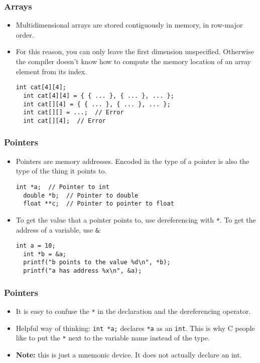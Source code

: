 \begin{frame}[fragile]
  \frametitle{Arrays}
  \begin{itemize}
  \item Multidimensional arrays are stored contiguously in memory, in row-major
    order.
  \item For this reason, you can only leave the first dimension unspecified.
    Otherwise the compiler doesn't know how to compute the memory location of an
    array element from its index.
\begin{lstlisting}[style=c]
  int cat[4][4];
  int cat[4][4] = { { ... }, { ... }, ... };
  int cat[][4] = { { ... }, { ... }, ... };
  int cat[][] = ...;  // Error
  int cat[][4];  // Error
\end{lstlisting}
  \end{itemize}
\end{frame}

\begin{frame}[fragile]
  \frametitle{Pointers}
  \begin{itemize}
  \item Pointers are memory addresses. Encoded in the type of a pointer is also
    the type of the thing it points to.
\begin{lstlisting}[style=c]
  int *a;  // Pointer to int
  double *b;  // Pointer to double
  float **c;  // Pointer to pointer to float
\end{lstlisting}
  \item To get the value that a pointer points to, use dereferencing with
    \texttt{*}. To get the address of a variable, use \texttt{\&}:
\begin{lstlisting}[style=c]
  int a = 10;
  int *b = &a;
  printf("b points to the value %d\n", *b);
  printf("a has address %x\n", &a);
\end{lstlisting}
  \end{itemize}
\end{frame}

\begin{frame}
  \frametitle{Pointers}
  \begin{itemize}
  \item It is easy to confuse the \texttt{*} in the declaration and the
    dereferencing operator.
  \item Helpful way of thinking: \texttt{int *a;} declares \texttt{*a} as an
    \texttt{int}. This is why C people like to put the \texttt{*} next to the
    variable name instead of the type.
  \item \textbf{Note:} this is just a mnemonic device. It does not actually
    declare an int.
  \end{itemize}
\end{frame}

